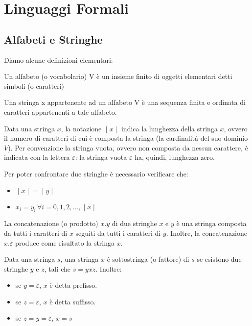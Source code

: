 \chapter{Linguaggi Formali}

  \section{Alfabeti e Stringhe}
  Diamo alcune definizioni elementari:
  \begin{definition}[Alfabeto]
    Un alfabeto (o vocabolario) V è un insieme finito di oggetti elementari detti simboli (o caratteri)
  \end{definition} 

  \begin{definition} [Stringa]
    Una stringa x appartenente ad un alfabeto V è una sequenza finita e ordinata di caratteri appartenenti a tale alfabeto.
  \end{definition}

  Data una stringa \(x\), la notazione \(\;|\;x\;|\;\) indica la lunghezza della stringa \(x\), ovvero il numero di caratteri di cui è composta la stringa (la cardinalità del suo dominio \(V\)). Per convenzione la stringa vuota, ovvero non composta da nessun carattere, è indicata con la lettera \(\varepsilon\): la stringa vuota \(\varepsilon\) ha, quindi, lunghezza zero. 

  Per poter confrontare due stringhe è necessario verificare che:
  \begin{itemize}
    \item \(\;|\;x\;|\; = \;|\;y\;|\;\)
    \item \(x_i = y_i\, \forall i=0,1,2,...,\;|\;x\;|\;\)
  \end{itemize}

  La concatenazione (o prodotto) \(x.y\) di due stringhe \(x\) e \(y\) è una stringa composta da tutti i caratteri di \(x\) seguiti da tutti i caratteri di \(y\). Inoltre, la concatenazione \(x.\varepsilon\) produce come risultato la stringa \(x\).

  Data una stringa \(s\), una stringa \(x\) è sottostringa (o fattore) di \(s\) se esistono due stringhe \(y\) e \(z\), tali che \(s=yxz\). Inoltre:
  \begin{itemize}
    \item se \(y=\varepsilon\), \(x\) è detta prefisso.
    \item se \(z=\varepsilon\), \(x\) è detta suffisso.
    \item se \(z=y=\varepsilon\), \(x=s\)
  \end{itemize}

